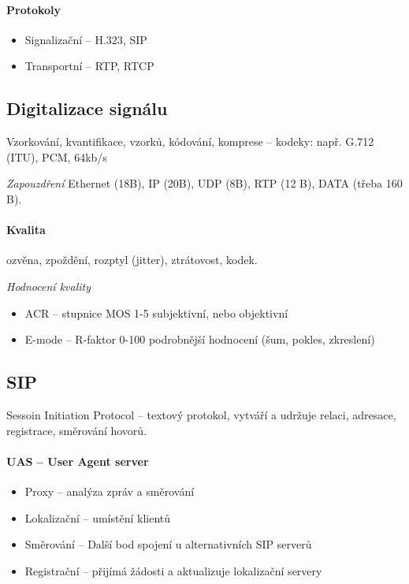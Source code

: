 \documentclass[a4paper, 11pt]{report}
\begin{document}
\paragraph{Protokoly}
\begin{itemize}
	\item Signalizační -- H.323, SIP
	\item Transportní -- RTP, RTCP
\end{itemize}

\subsection{Digitalizace signálu}

Vzorkování, kvantifikace, vzorků, kódování, komprese -- kodeky: např. G.712 (ITU), PCM, 64kb/s

\emph{Zapouzdření} Ethernet (18B), IP (20B), UDP (8B), RTP (12 B), DATA (třeba 160 B).

\paragraph{Kvalita} ozvěna, zpoždění, rozptyl (jitter), ztrátovost, kodek.

\emph{Hodnocení kvality}
\begin{itemize}
	\item ACR -- stupnice MOS 1-5 subjektivní, nebo objektivní
	\item E-mode -- R-faktor 0-100 podrobnější hodnocení (šum, pokles, zkreslení)
\end{itemize}

\subsection{SIP}
Sessoin Initiation Protocol -- textový protokol, vytváří a udržuje relaci, adresace, registrace, směrování hovorů.

\paragraph{UAS -- User Agent server}
\begin{itemize}
	\item Proxy -- analýza zpráv a směrování
	\item Lokalizační -- umístění klientů
	\item Směrování -- Další bod spojení u alternativních SIP serverů
	\item Registrační -- přijímá žádosti a aktualizuje lokalizační servery
\end{itemize}
\end{document}
